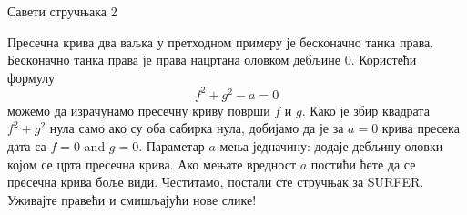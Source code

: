 ﻿\documentclass[en]{./../../common/SurferDesc}%
\begin{document}
\footnotesize
%

 
 \begin{surferPage}
  \begin{surferTitle}Савети стручњака 2\end{surferTitle}
   \begin{surferText}

Пресечна крива два ваљка у претходном примеру је бесконачно танка права. Бесконачно танка права је права нацртана оловком дебљине 0. Користећи формулу
\[ f^2+g^2-a=0\]
можемо да израчунамо пресечну криву површи $f$ и $g$. Како је збир квадрата $f^2+g^2$ нула само ако су оба сабирка нула, добијамо да је за $a=0$ крива пресека дата са $f=0$ and $g=0$.
Параметар $a$ мења једначину: додаје дебљину оловки којом се црта пресечна крива. Ако мењате вредност $a$ постићи ћете да се пресечна крива боље види.
\newline \newline
Честитамо, постали сте стручњак за SURFER. Уживајте правећи и смишљајући нове слике!
 


     \end{surferText}
\end{surferPage}

\end{document}
